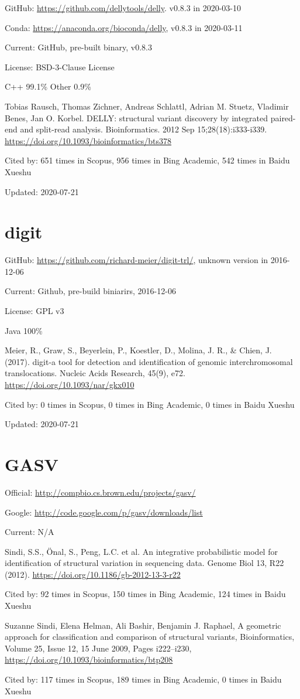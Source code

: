 \documentclass[]{article}
\newcommand{\cb}[3]{\par Cited by: {\color{blue}\Huge #1} times in Scopus, {\color{blue}\Huge #2} times in Bing Academic, {\color{blue}\Huge #3} times in Baidu Xueshu}
\begin{document}
GitHub: \url{https://github.com/dellytools/delly}. v0.8.3 in 2020-03-10

Conda: \url{https://anaconda.org/bioconda/delly}, v0.8.3 in 2020-03-11

Current: GitHub, pre-built binary, v0.8.3

License:  BSD-3-Clause License 

C++ 99.1\% Other 0.9\%

Tobias Rausch, Thomas Zichner, Andreas Schlattl, Adrian M. Stuetz, Vladimir Benes, Jan O. Korbel. DELLY: structural variant discovery by integrated paired-end and split-read analysis. Bioinformatics. 2012 Sep 15;28(18):i333-i339. \url{https://doi.org/10.1093/bioinformatics/bts378}\cb{651}{956}{542}

Updated: 2020-07-21

\section{digit}

GitHub: \url{https://github.com/richard-meier/digit-trl/}, unknown version in 2016-12-06

Current: Github, pre-build biniarirs, 2016-12-06

License: GPL v3

Java 100\%

Meier, R., Graw, S., Beyerlein, P., Koestler, D., Molina, J. R., \& Chien, J. (2017). digit-a tool for detection and identification of genomic interchromosomal translocations. Nucleic Acids Research, 45(9), e72. \url{https://doi.org/10.1093/nar/gkx010}\cb{0}{0}{0}

Updated: 2020-07-21

\section{GASV}

Official: \url{http://compbio.cs.brown.edu/projects/gasv/}

Google: \url{http://code.google.com/p/gasv/downloads/list}

Current: N/A

Sindi, S.S., Önal, S., Peng, L.C. et al. An integrative probabilistic model for identification of structural variation in sequencing data. Genome Biol 13, R22 (2012). \url{https://doi.org/10.1186/gb-2012-13-3-r22}\cb{92}{150}{124}

Suzanne Sindi, Elena Helman, Ali Bashir, Benjamin J. Raphael, A geometric approach for classification and comparison of structural variants, Bioinformatics, Volume 25, Issue 12, 15 June 2009, Pages i222–i230, \url{https://doi.org/10.1093/bioinformatics/btp208}\cb{117}{189}{0}
\end{document}
